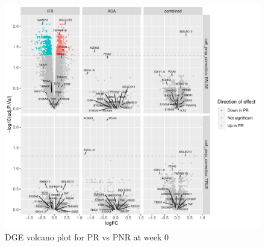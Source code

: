 \begin{outline}
\begin{figure}
    \centering
    \includegraphics[width=1.0\textwidth,page=1]{mainmatter/figures/chapter_04/plot_gene_set_enrichment.dge_result_volcano_simple_C_1RI_1NI,C_1RA_1NA,C_1R_1N.pdf}
    \caption{DGE volcano plot for PR vs PNR at week 0}
    \label{fig:multipants_dge_volcano_week_0_R_N}
\end{figure}



\end{outline}
